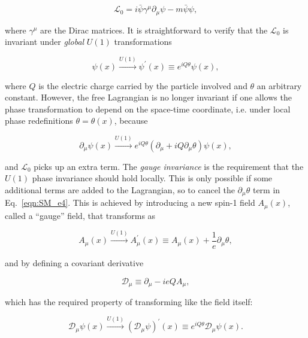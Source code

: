 \begin{equation}\label{eqn:SM_e2}
\mathcal{L}_0 = i\bar{\psi}\gamma^\mu\partial_\mu\psi - m\bar{\psi}\psi , 
\end{equation}

\noindent where $\gamma^\mu$ are the Dirac matrices.
It is straightforward to verify that the $\mathcal{L}_0$ is invariant under \textit{global} $U(1)$ transformations

\begin{equation}\label{eqn:SM_e3}
\psi(x) \xrightarrow{U(1)} \psi^\prime(x) \equiv e^{iQ\theta} \psi(x),
\end{equation}

\noindent where $Q$ is the electric charge carried by the particle involved and $\theta$ an arbitrary constant.
However, the free Lagrangian is no longer invariant if one allows the phase transformation to depend on the space-time coordinate, i.e. under local phase redefinitions $\theta = \theta(x)$, because

\begin{equation}\label{eqn:SM_e4}
\partial_\mu\psi(x) \xrightarrow{U(1)} e^{iQ\theta} (\partial_\mu + iQ\partial_\mu\theta)\psi(x),
\end{equation}

\noindent and $\mathcal{L}_0$ picks up an extra term.
The \textit{gauge invariance} is the requirement that the $U(1)$ phase invariance should hold locally.
This is only possible if some additional terms are added to the Lagrangian, so to cancel the $\partial_\mu\theta$ term in Eq.~\ref{eqn:SM_e4}.
This is achieved by introducing a new spin-1 field $A_\mu(x)$, called a ``gauge'' field, that transforms as

\begin{equation}\label{eqn:SM_e5}
A_\mu(x) \xrightarrow{U(1)} A^\prime_\mu(x) \equiv A_\mu(x) + \frac{1}{e}\partial_\mu\theta, 
\end{equation}

\noindent and by defining a covariant derivative

\begin{equation}\label{eqn:SM_e6}
\mathcal{D}_\mu \equiv \partial_\mu - ieQA_\mu,
\end{equation}

\noindent which has the required property of transforming like the field itself:

\begin{equation}\label{eqn:SM_e7}
\mathcal{D}_\mu\psi(x) \xrightarrow{U(1)} (\mathcal{D}_\mu\psi)^\prime(x) \equiv e^{iQ\theta} \mathcal{D}_\mu\psi(x).
\end{equation}

